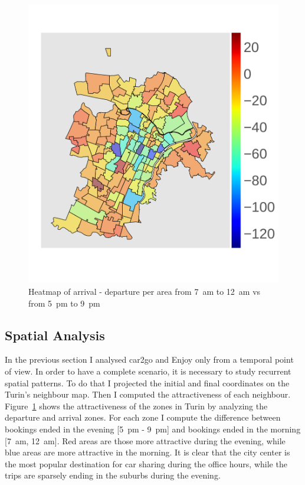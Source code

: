 \begin{figure}[h!]
\centering
\vspace{-10pt}
 \includegraphics[width=0.75\columnwidth]{figures/clorophlet_o_minus_o1.pdf}
 \vspace{-10pt}
 \caption{Heatmap of arrival - departure per area from 7~am to 12~am vs from 5~pm to 9~pm \label{fig:3_5_heatmap_arr_dep}}
\end{figure}


\subsection{Spatial Analysis}  


In the previous section I analysed car2go and Enjoy only from a temporal point of view. In order to have a complete scenario, it is necessary to study recurrent spatial patterns. To do that I projected the initial and final coordinates on the Turin's neighbour map. Then I computed the attractiveness of each neighbour. Figure~\ref{fig:3_5_heatmap_arr_dep} shows the attractiveness of the  zones in Turin by analyzing the departure and arrival zones. For each zone I compute the difference between bookings ended in the evening [5~pm - 9~pm] and bookings ended in the morning [7~am, 12~am]. Red {areas are those} more attractive during the evening, while blue areas are more attractive in the morning. It is clear that the city center is the most popular destination for car sharing during the office hours, while the trips are sparsely ending in the suburbs during the evening.


